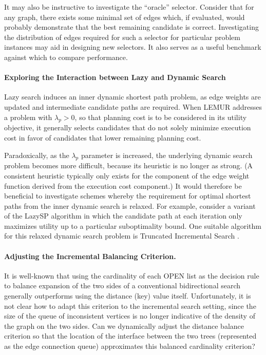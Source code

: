 It may also be instructive to investigate the ``oracle'' selector.
Consider that for any graph,
there exists some minimal set of edges which, if evaluated,
would probably demonstrate that the best remaining candidate is
correct.
Investigating the distribution of edges required for such a selector
for particular problem instances
may aid in designing new selectors.
It also serves as a useful benchmark against which to compare performance.

\paragraph{Exploring the Interaction between Lazy and Dynamic Search}
Lazy search induces an inner dynamic shortest path problem,
as edge weights are updated and intermediate candidate paths are
required.
When LEMUR addresses a problem with $\lambda_p > 0$,
so that planning cost is to be considered in its utility objective,
it generally selects candidates that do not solely minimize execution cost
in favor of candidates that lower remaining planning cost.

Paradoxically,
as the $\lambda_p$ parameter is increased,
the underlying dynamic search problem becomes more difficult,
because its heuristic is no longer as strong.
(A consistent heuristic typically only exists for the component of
the edge weight function derived from the execution cost component.)
It would therefore be beneficial to investigate schemes whereby
the requirement for optimal shortest paths from the inner
dynamic search is relaxed.
For example,
consider a variant of the LazySP algorithm
in which the candidate path at each iteration only maximizes utility
up to a particular suboptimality bound. 
One suitable algorithm for this relaxed dynamic search problem
is Truncated Incremental Search \citep{aine2016truncatedincremental}.

\paragraph{Adjusting the Incremental Balancing Criterion.}
It is well-known \citep{pohl1969bidirectional}
that using the cardinality of each OPEN list as the decision rule
to balance expansion of the two sides of a conventional bidirectional
search generally outperforms using the distance (key) value itself.
Unfortunately,
it is not clear how to adapt this criterion to the incremental
search setting,
since the size of the queue of inconsistent vertices is no longer
indicative of the density of the graph on the two sides.
Can we dynamically adjust the distance balance criterion
so that the location of the interface between the two trees
(represented as the edge connection queue)
approximates this balanced cardinality criterion?

